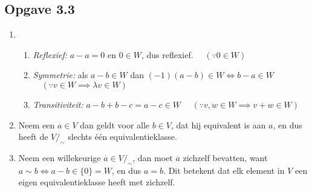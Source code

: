 \documentclass{article}
\newcommand{\q}{/_\sim}
\newcommand{\ol}[1]{\overline{#1}}
\begin{document}
\subsection*{Opgave 3.3}
\begin{enumerate}[label=\alph*)]
	\item
	      \begin{enumerate}[label=\arabic*]
		      \item \emph{Reflexief:} $a-a = 0$ en $0 \in W$,
		            dus reflexief.
		            $\quad (\because 0 \in W)$
		      \item \emph{Symmetrie:} als $a-b \in W$
		            dan $(-1)(a - b) \in W
			            \Longleftrightarrow b - a\in W $
		            $\quad (\because v \in W \implies \lambda v \in W)$
		      \item \emph{Transitiviteit:} $a - b + b - c  =
			            a - c \in W$
		            $\quad (\because v, w \in W \implies v + w \in W)$
	      \end{enumerate}
	\item
	      Neem een $a \in V$ dan geldt voor alle $b \in V$,
	      dat hij equivalent is aan $a$, en dus heeft de
	      $V\q$ slechts één equivalentieklasse.
	\item
	      Neem een willekeurige $\ol{a} \in V\q$,
	      dan moet $\ol{a}$ zichzelf bevatten,
	      want $a \sim b \Leftrightarrow a-b \in \{0\} = W$, en
	      dus $a = b$. Dit betekent dat elk element in $V$
	      een eigen equivalentieklasse heeft met zichzelf.

\end{enumerate}
\end{document}
